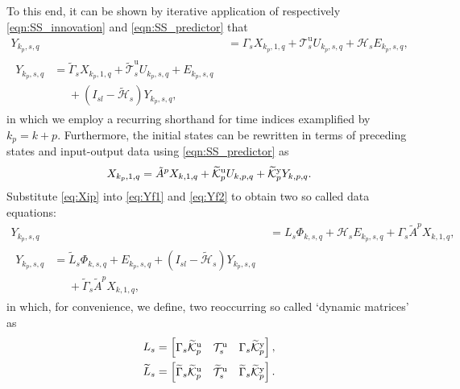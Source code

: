 To this end, it can be shown by iterative application of respectively \eqref{eqn:SS_innovation} and \eqref{eqn:SS_predictor} that%
\begin{align}
    Y_{k_p,s,q} &= \Gamma_s X_{k_p,1,q} + \mathcal{T}_s^\mathrm{u} U_{k_p,s,q} + \mathcal{H}_s E_{k_p,s,q}\label{eq:Yf1},\\
    \begin{split}%
    Y_{k_p,s,q} &= \widetilde{\Gamma}_s X_{k_p,1,q} + \widetilde{\mathcal{T}}_s^\mathrm{u} U_{k_p,s,q} + E_{k_p,s,q}\\
    &\phantom{=}+(I_{sl}-\widetilde{\mathcal{H}}_s)Y_{k_p,s,q},
    \end{split}\label{eq:Yf2}
\end{align}
in which we employ a recurring shorthand for time indices examplified by $k_p=k+p$. Furthermore, the initial states can be rewritten in terms of preceding states and input-output data using \eqref{eqn:SS_predictor} as%
\begin{align}\label{eq:Xip}
    X_{k_p,1,q} = \tilde{A}^p X_{k,1,q} + \widetilde{\mathcal{K}}_{p}^{\mathrm{{u}}} U_{k,p,q} + \widetilde{\mathcal{K}}_{p}^{\mathrm{{y}}} Y_{k,p,q}.
\end{align}
Substitute \eqref{eq:Xip} into \eqref{eq:Yf1} and \eqref{eq:Yf2} %
to obtain two so called data equations:
\begin{align}
    Y_{k_p,s,q} &= L_s \Phi_{k,s,q} + \mathcal{H}_s E_{k_p,s,q} + \Gamma_s \tilde{A}^p X_{k,1,q},\label{eq:DataEq1}\\
    \begin{split}
    Y_{k_p,s,q} &= \widetilde{L}_s \Phi_{k,s,q} + E_{k_p,s,q} + (I_{sl}-\widetilde{\mathcal{H}}_s) Y_{k_p,s,q} \\
    &\phantom{=}+ \widetilde{\Gamma}_s \tilde{A}^p X_{k,1,q},
    \end{split}\label{eq:DataEq2}
\end{align}
in which, for convenience, we define, two reoccurring so called `dynamic matrices' as
\begin{align*}
    L_s &= \begin{bmatrix} \Gamma_s\tKp{u} & \mathcal{T}_s^\mathrm{u} & \Gamma_s\tKp{y} \end{bmatrix},\\%
    \widetilde{L}_s &= \begin{bmatrix} \widetilde{\Gamma}_s\tKp{u} & \widetilde{\mathcal{T}}_s^\mathrm{u} & \widetilde{\Gamma}_s\tKp{y} \end{bmatrix}.
\end{align*}

